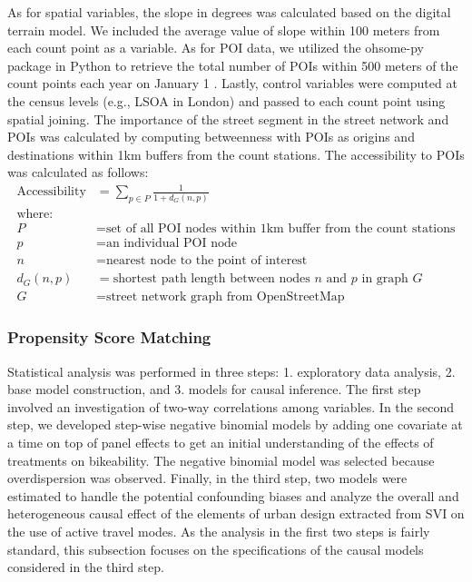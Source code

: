 \documentclass[preprint,12pt, authoryear]{elsarticle}
\begin{document}
As for spatial variables, the slope in degrees was calculated based on the digital terrain model. We included the average value of slope within 100 meters from each count point as a variable. As for POI data, we utilized the ohsome-py package in Python to retrieve the total number of POIs within 500 meters of the count points each year on January 1 \citep{klonner_sketch_2021}. Lastly, control variables were computed at the census levels (e.g., LSOA in London) and passed to each count point using spatial joining. The importance of the street segment in the street network and POIs was calculated by computing betweenness with POIs as origins and destinations within 1km buffers from the count stations. The accessibility to POIs was calculated as follows:
\begin{align*}
\text{Accessibility} &= \sum_{p \in P} \frac{1}{1 + d_G(n, p)} \\[10pt]
\text{where:} \\
P &= \text{set of all POI nodes within 1km buffer from the count stations} \\
p &= \text{an individual POI node} \\
n &= \text{nearest node to the point of interest} \\
d_G(n, p) &= \text{shortest path length between nodes $n$ and $p$ in graph $G$} \\
G &= \text{street network graph from OpenStreetMap}
\end{align*}

\subsubsection{Propensity Score Matching}
Statistical analysis was performed in three steps: 1. exploratory data analysis, 2. base model construction, and 3. models for causal inference. The first step involved an investigation of two-way correlations among variables. In the second step, we developed step-wise negative binomial models by adding one covariate at a time on top of panel effects to get an initial understanding of the effects of treatments on bikeability. The negative binomial model was selected because overdispersion was observed. Finally, in the third step, two models were estimated to handle the potential confounding biases and analyze the overall and heterogeneous causal effect of the elements of urban design extracted from SVI on the use of active travel modes. As the analysis in the first two steps is fairly standard, this subsection focuses on the specifications of the causal models considered in the third step.  
\end{document}
